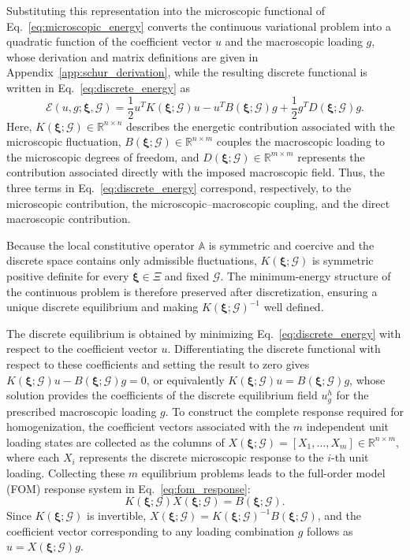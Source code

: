 \documentclass[pdflatex,sn-basic,Numbered]{sn-jnl}
\newcommand{\R}{\mathbb{R}}
\newcommand{\G}{\mathcal{G}}
\begin{document}
Substituting this representation into the microscopic functional of
Eq.~\eqref{eq:microscopic_energy} converts the continuous variational problem
into a quadratic function of the coefficient vector \(u\) and the
macroscopic loading \(g\), whose derivation and matrix definitions are given
in Appendix~\ref{app:schur_derivation}, while the resulting discrete
functional is written in Eq.~\eqref{eq:discrete_energy} as
\begin{equation}
\label{eq:discrete_energy}
\mathcal E(u,g;\boldsymbol\xi,\G)
=
\frac{1}{2}
u^T K(\boldsymbol\xi;\G)u
-
u^T B(\boldsymbol\xi;\G)g
+
\frac{1}{2}
g^T D(\boldsymbol\xi;\G)g.
\end{equation}
Here,
\(K(\boldsymbol\xi;\G)\in\R^{n\times n}\) describes the energetic
contribution associated with the microscopic fluctuation,
\(B(\boldsymbol\xi;\G)\in\R^{n\times m}\) couples the macroscopic loading to
the microscopic degrees of freedom, and
\(D(\boldsymbol\xi;\G)\in\R^{m\times m}\) represents the contribution
associated directly with the imposed macroscopic field. Thus, the three terms
in Eq.~\eqref{eq:discrete_energy} correspond, respectively, to the
microscopic contribution, the microscopic--macroscopic coupling, and the
direct macroscopic contribution.

Because the local constitutive operator \(\mathbb A\) is symmetric and
coercive and the discrete space contains only admissible fluctuations,
\(K(\boldsymbol\xi;\G)\) is symmetric positive definite for every
\(\boldsymbol\xi\in\Xi\) and fixed \(\G\). The minimum-energy structure of
the continuous problem is therefore preserved after discretization, ensuring
a unique discrete equilibrium and making
\(K(\boldsymbol\xi;\G)^{-1}\) well defined.

The discrete equilibrium is obtained by minimizing
Eq.~\eqref{eq:discrete_energy} with respect to the coefficient vector \(u\).
Differentiating the discrete functional with respect to these coefficients
and setting the result to zero gives
\(K(\boldsymbol\xi;\G)u-B(\boldsymbol\xi;\G)g=0\), or equivalently
\(K(\boldsymbol\xi;\G)u=B(\boldsymbol\xi;\G)g\), whose solution provides
the coefficients of the discrete equilibrium field \(u_g^h\) for the
prescribed macroscopic loading \(g\). To construct the complete response
required for homogenization, the coefficient vectors associated with the
\(m\) independent unit loading states are collected as the columns of
\(X(\boldsymbol\xi;\G)=[X_1,\ldots,X_m]\in\R^{n\times m}\), where each
\(X_i\) represents the discrete microscopic response to the \(i\)-th unit
loading. Collecting these \(m\) equilibrium problems leads to the full-order
model (FOM) response system in Eq.~\eqref{eq:fom_response}:
\begin{equation}
\label{eq:fom_response}
K(\boldsymbol\xi;\G)X(\boldsymbol\xi;\G)
=
B(\boldsymbol\xi;\G).
\end{equation}
Since \(K(\boldsymbol\xi;\G)\) is invertible,
\(X(\boldsymbol\xi;\G)
=
K(\boldsymbol\xi;\G)^{-1}B(\boldsymbol\xi;\G)\), and the coefficient vector
corresponding to any loading combination \(g\) follows as
\(u=X(\boldsymbol\xi;\G)g\).
\end{document}
